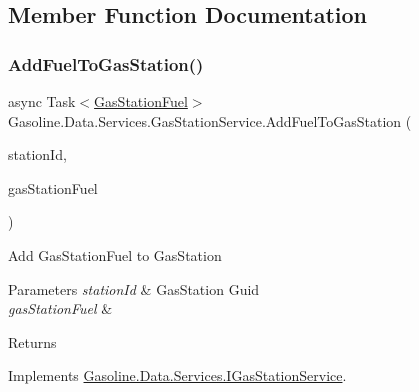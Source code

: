 \subsection{Member Function Documentation}
\mbox{\label{class_gasoline_1_1_data_1_1_services_1_1_gas_station_service_ab9690eb56ba3a4a9c02d3ab8424990b0}} 
\subsubsection{\texorpdfstring{AddFuelToGasStation()}{AddFuelToGasStation()}}
{\footnotesize\ttfamily async Task$<$\mbox{\hyperlink{class_gasoline_1_1_data_1_1_models_1_1_gas_station_fuel}{Gas\+Station\+Fuel}}$>$ Gasoline.\+Data.\+Services.\+Gas\+Station\+Service.\+Add\+Fuel\+To\+Gas\+Station (\begin{DoxyParamCaption}\item[{Guid}]{station\+Id,  }\item[{\mbox{\hyperlink{class_gasoline_1_1_data_1_1_models_1_1_gas_station_fuel}{Gas\+Station\+Fuel}}}]{gas\+Station\+Fuel }\end{DoxyParamCaption})}



Add Gas\+Station\+Fuel to Gas\+Station 


\begin{DoxyParams}{Parameters}
{\em station\+Id} & Gas\+Station Guid\\
\hline
{\em gas\+Station\+Fuel} & \\
\hline
\end{DoxyParams}
\begin{DoxyReturn}{Returns}

\end{DoxyReturn}


Implements \mbox{\hyperlink{interface_gasoline_1_1_data_1_1_services_1_1_i_gas_station_service_ac98dd15c284e623253f9fcec2cd2db97}{Gasoline.\+Data.\+Services.\+I\+Gas\+Station\+Service}}.

\mbox{\label{class_gasoline_1_1_data_1_1_services_1_1_gas_station_service_a54922c75e2b138c45dc94dbf0c0c5b29}} 
